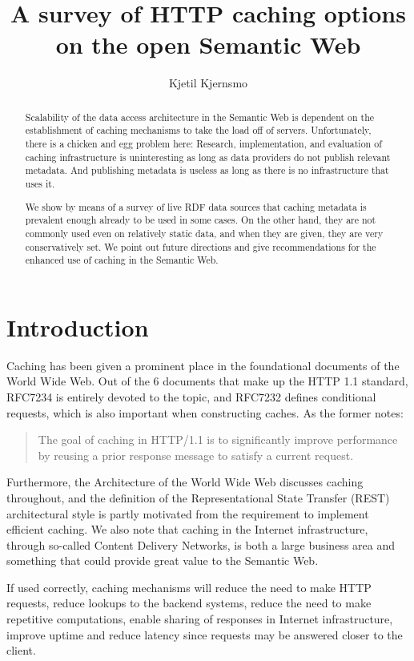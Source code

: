 \documentclass{llncs}
\title{A survey of HTTP caching options on the open Semantic Web}
\author{Kjetil Kjernsmo}
\institute{Department of Informatics,
Postboks 1080 Blindern,
N-0316 Oslo, Norway \email{kjetil@kjernsmo.net}}
\begin{document}
\maketitle

\begin{abstract}
Scalability of the data access architecture in the Semantic Web is
dependent on the establishment of caching mechanisms to take the load
off of servers.  Unfortunately, there is a chicken and egg problem
here: Research, implementation, and evaluation of caching
infrastructure is uninteresting as long as data providers do not
publish relevant metadata.  And publishing metadata is useless as long
as there is no infrastructure that uses it.

We show by means of a survey of live RDF data sources that caching
metadata is prevalent enough already to be used in some cases.  On the
other hand, they are not commonly used even on relatively static data,
and when they are given, they are very conservatively set. We point
out future directions and give recommendations for the enhanced use of
caching in the Semantic Web.
\end{abstract}

\section{Introduction}

Caching has been given a prominent place in the foundational documents
of the World Wide Web. Out of the 6 documents that make up the HTTP
1.1 standard, RFC7234 \cite{rfc7234} is entirely devoted to the topic,
and RFC7232 \cite{rfc7232} defines conditional requests, which is also
important when constructing caches. As the former notes:
\begin{quote} 
  The goal of caching in HTTP/1.1 is to significantly improve
  performance by reusing a prior response message to satisfy a current
  request.
\end{quote}
Furthermore, the Architecture of the World Wide Web
\cite{Jacobs:04:AWW} discusses caching throughout, and the definition
of the Representational State Transfer (REST) architectural style
\cite{Fielding_2000_Architectural-Styles} is partly motivated from the
requirement to implement efficient caching. We also note that caching
in the Internet infrastructure, through so-called Content Delivery
Networks, is both a large business area and something that could
provide great value to the Semantic Web.

If used correctly, caching mechanisms will reduce the need to make
HTTP requests, reduce lookups to the backend systems, reduce the need
to make repetitive computations, enable sharing of responses in
Internet infrastructure, improve uptime and reduce latency since
requests may be answered closer to the client.
\end{document}
